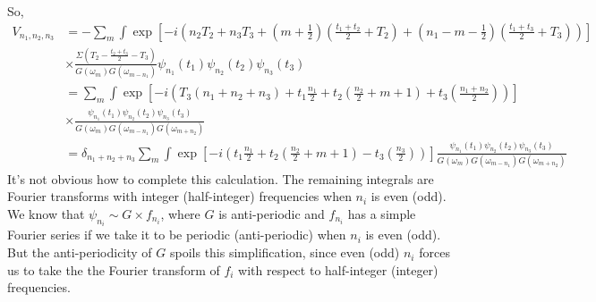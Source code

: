 \documentclass[aps,prx,preprint,onecolumn,citeautoscript,footinbib]{revtex4-1}
\begin{document}
So,
\begin{equation*}
    \begin{aligned}
        V_{n_1, n_2, n_3} &=-\sum_m  \int \exp\left[-i \left(n_2 T_2 + n_3 T_3 + \left(m + \frac{1}{2}\right)\left(\frac{t_1 + t_2}{2} + T_2\right) +  \left(n_1-m - \frac{1}{2}\right)\left(\frac{t_1 + t_3}{2} + T_3\right)\right)\right]
        \\
        &\times \frac{\Sigma\left(T_2 - \frac{t_2 + t_3}{2} - T_3\right)}{G(\omega_m) G(\omega_{m-n_1})}\psi_{n_1}(t_1)\psi_{n_2}(t_2)\psi_{n_3}(t_3)
        \\
        &= \sum_m \int %
        \exp\left[-i\left(T_3(n_1 + n_2 + n_3) + t_1 \frac{n_1}{2} + t_2 \left(\frac{n_2}{2}+m+1\right) + t_3\left(\frac{n_1 + n_2}{2}\right)\right)\right]
        \\
        &\times \frac{\psi_{n_1}(t_1) \psi_{n_2}(t_2) \psi_{n_3}(t_3)}{G(\omega_m) G(\omega_{m-{n_1}})G(\omega_{m + n_2})}
        \\
        &= \delta_{n_1 + n_2 + n_3} \sum_m\int  \exp\left[-i\left(t_1 \frac{n_1}{2} + t_2 \left(\frac{n_2}{2}+m+1\right) - t_3\left(\frac{n_3}{2}\right)\right)\right]\frac{\psi_{n_1}(t_1) \psi_{n_2}(t_2) \psi_{n_3}(t_3)}{G(\omega_m) G(\omega_{m-{n_1}})G(\omega_{m + n_2})}
    \end{aligned}
\end{equation*}
It's not obvious how to complete this calculation. The remaining integrals are Fourier transforms with integer (half-integer) frequencies when $n_i$ is even (odd). We know that $\psi_{n_i} \sim G \times f_{n_i}$, where $G$ is anti-periodic and $f_{n_i}$ has a simple Fourier series if we take it to be periodic (anti-periodic) when $n_i$ is even (odd). But the anti-periodicity of $G$ spoils this simplification, since even (odd) $n_i$ forces us to take the the Fourier transform of $f_i$ with respect to half-integer (integer) frequencies.
\end{document}
